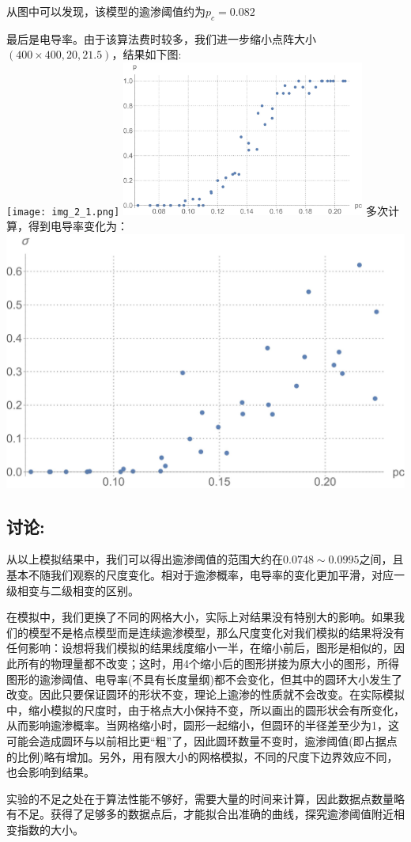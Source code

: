 \documentclass[utf8]{ctexart}
\begin{document}
	从图中可以发现，该模型的逾渗阈值约为$p_c=0.082$

	最后是电导率。由于该算法费时较多，我们进一步缩小点阵大小$(400\times400,20,21.5)$，结果如下图:\\
	\texttt{[image: img\_2\_1.png]}
	\includegraphics[width=0.6\textwidth]{fig3.jpg}
	多次计算，得到电导率变化为：\\
	\includegraphics[width=\textwidth]{fig4.jpg}\\

	\subsection*{讨论:}
	从以上模拟结果中，我们可以得出逾渗阈值的范围大约在$0.0748\sim0.0995$之间，且基本不随我们观察的尺度变化。相对于逾渗概率，电导率的变化更加平滑，对应一级相变与二级相变的区别。

	在模拟中，我们更换了不同的网格大小，实际上对结果没有特别大的影响。如果我们的模型不是格点模型而是连续逾渗模型，那么尺度变化对我们模拟的结果将没有任何影响：设想将我们模拟的结果线度缩小一半，在缩小前后，图形是相似的，因此所有的物理量都不改变；这时，用4个缩小后的图形拼接为原大小的图形，所得图形的逾渗阈值、电导率(不具有长度量纲)都不会变化，但其中的圆环大小发生了改变。因此只要保证圆环的形状不变，理论上逾渗的性质就不会改变。在实际模拟中，缩小模拟的尺度时，由于格点大小保持不变，所以画出的圆形状会有所变化，从而影响逾渗概率。当网格缩小时，圆形一起缩小，但圆环的半径差至少为1，这可能会造成圆环与以前相比更“粗”了，因此圆环数量不变时，逾渗阈值(即占据点的比例)略有增加。另外，用有限大小的网格模拟，不同的尺度下边界效应不同，也会影响到结果。

	实验的不足之处在于算法性能不够好，需要大量的时间来计算，因此数据点数量略有不足。获得了足够多的数据点后，才能拟合出准确的曲线，探究逾渗阈值附近相变指数的大小。
	
	
\end{document}
